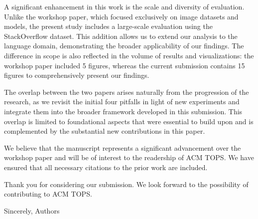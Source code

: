 A significant enhancement in this work is the scale and diversity of evaluation. Unlike the workshop paper, which focused exclusively on image datasets and models, the present study includes a large-scale evaluation using the StackOverflow dataset. This addition allows us to extend our analysis to the language domain, demonstrating the broader applicability of our findings. The difference in scope is also reflected in the volume of results and visualizations: the workshop paper included 5 figures, whereas the current submission contains 15 figures to comprehensively present our findings.

The overlap between the two papers arises naturally from the progression of the research, as we revisit the initial four pitfalls in light of new experiments and integrate them into the broader framework developed in this submission. This overlap is limited to foundational aspects that were essential to build upon and is complemented by the substantial new contributions in this paper.

We believe that the manuscript represents a significant advancement over the workshop paper and will be of interest to the readership of ACM TOPS. We have ensured that all necessary citations to the prior work are included.

Thank you for considering our submission. We look forward to the possibility of contributing to ACM TOPS.

Sincerely,
Authors